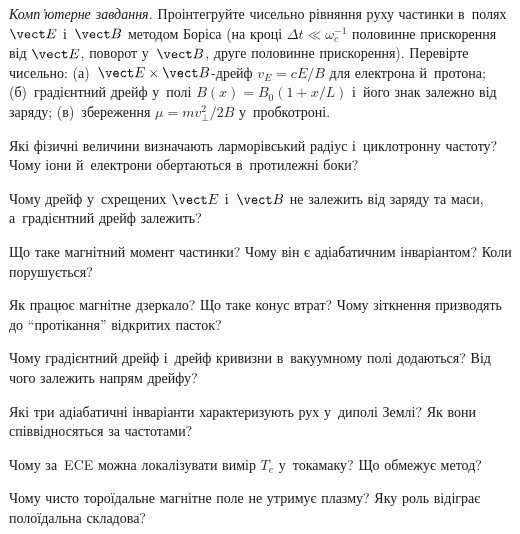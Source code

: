 \begin{problem}\label{prb:BorisPusher}
	\emph{Комп'ютерне завдання.} Проінтегруйте чисельно рівняння руху частинки в~полях
	$\vect E$ і~$\vect B$ методом Боріса (на кроці $\Delta t\ll\omega_c^{-1}$ половинне прискорення
	від $\vect E$, поворот у~$\vect B$, друге половинне прискорення). Перевірте чисельно:
	(а)~$\vect E\times\vect B$-дрейф $v_E=cE/B$ для електрона й~протона; (б)~градієнтний дрейф у~полі
	$B(x)=B_0(1+x/L)$ і~його знак залежно від заряду; (в)~збереження $\mu=mv_\perp^2/2B$ у~пробкотроні.
\end{problem}


\begin{Questions}
\begin{quizlist}
\item Які фізичні величини визначають ларморівський радіус і~циклотронну частоту?
		  Чому іони й~електрони обертаються в~протилежні боки?

\item Чому дрейф у~схрещених $\vect E$ і~$\vect B$ не залежить від заряду та маси,
		  а~градієнтний дрейф залежить?

\item Що таке магнітний момент частинки? Чому він є адіабатичним інваріантом? Коли
		  порушується?

\item Як працює магнітне дзеркало? Що таке конус втрат? Чому зіткнення призводять до \enquote{протікання}
		  відкритих пасток?

\item Чому градієнтний дрейф і~дрейф кривизни в~вакуумному полі додаються? Від чого залежить
		  напрям дрейфу?

\item Які три адіабатичні інваріанти характеризують рух у~диполі Землі? Як вони співвідносяться
		  за частотами?

\item Чому за~ECE можна локалізувати вимір $T_e$ у~токамаку? Що обмежує метод?

\item Чому чисто тороїдальне магнітне поле не утримує плазму? Яку роль відіграє
		  полоїдальна складова?

\end{quizlist}
\end{Questions}

